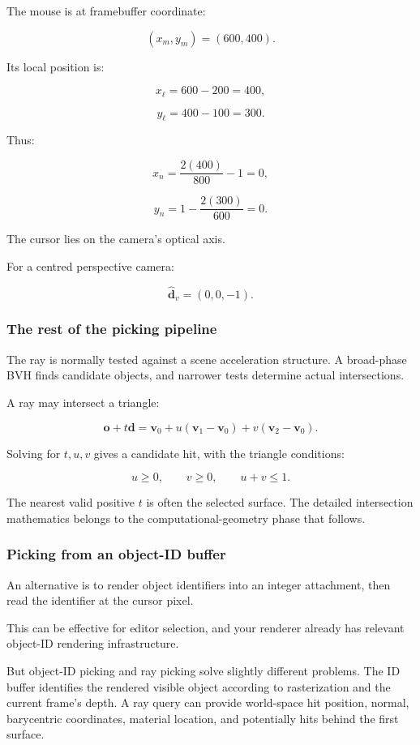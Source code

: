 The mouse is at framebuffer coordinate:

\[ (x_m,y_m)=(600,400). \]

Its local position is:

\[ x_\ell=600-200=400, \]

\[ y_\ell=400-100=300. \]

Thus:

\[ x_n=\frac{2(400)}{800}-1=0, \]

\[ y_n=1-\frac{2(300)}{600}=0. \]

The cursor lies on the camera's optical axis.

For a centred perspective camera:

\[ \boxed{ \hat{\mathbf d}_v=(0,0,-1). } \]

\subsubsection{The rest of the picking pipeline}\label{the-rest-of-the-picking-pipeline}

The ray is normally tested against a scene acceleration structure. A broad-phase BVH finds candidate objects, and narrower tests determine actual intersections.

A ray may intersect a triangle:

\[ \mathbf o+t\mathbf d = \mathbf v_0+ u(\mathbf v_1-\mathbf v_0)+ v(\mathbf v_2-\mathbf v_0). \]

Solving for \(t,u,v\) gives a candidate hit, with the triangle conditions:

\[ u\ge0,\qquad v\ge0,\qquad u+v\le1. \]

The nearest valid positive \(t\) is often the selected surface. The detailed intersection mathematics belongs to the computational-geometry phase that follows.

\subsubsection{Picking from an object-ID buffer}\label{picking-from-an-object-id-buffer}

An alternative is to render object identifiers into an integer attachment, then read the identifier at the cursor pixel.

This can be effective for editor selection, and your renderer already has relevant object-ID rendering infrastructure.

But object-ID picking and ray picking solve slightly different problems. The ID buffer identifies the rendered visible object according to rasterization and the current frame's depth. A ray query can provide world-space hit position, normal, barycentric coordinates, material location, and potentially hits behind the first surface.

